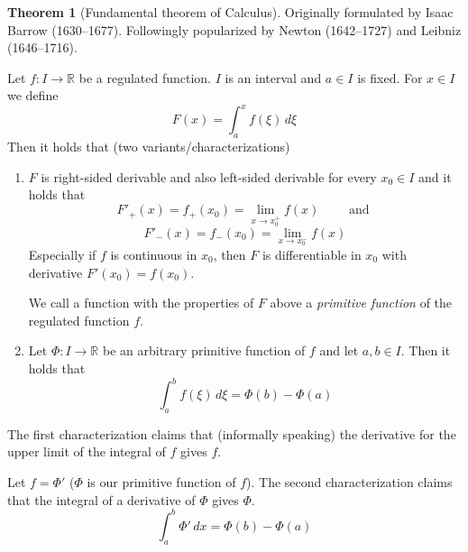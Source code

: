 \documentclass[a4paper,landscape,twocolumn]{article}
\theoremstyle{definition}
\newtheorem{theorem}{Theorem}
\begin{document}
\begin{theorem}[Fundamental theorem of Calculus]
  Originally formulated by Isaac Barrow (1630--1677).
  Followingly popularized by Newton (1642--1727) and Leibniz (1646--1716).

  Let $f: I \to \mathbb R$ be a regulated function. $I$ is an interval and $a \in I$ is fixed.
  For $x \in I$ we define
  \[ F(x) = \int_a^x f(\xi) \, d\xi \]
  Then it holds that (two variants/characterizations)
  \begin{enumerate}
    \item $F$ is right-sided derivable and also left-sided derivable for every $x_0 \in I$
      and it holds that
      \[ F'_+(x) = f_+(x_0) = \lim_{x\to x^+_0} f(x) \qquad \text{ and } \]
      \[ F'_-(x) = f_-(x_0) = \lim_{x\to x^-_0} f(x) \]
      Especially if $f$ is continuous in $x_0$, then $F$ is differentiable in $x_0$ with
      derivative $F'(x_0) = f(x_0)$.

      We call a function with the properties of $F$ above a \emph{primitive function} of the regulated function $f$.
    \item
      Let $\Phi: I \to \mathbb R$ be an arbitrary primitive function of $f$ and
      let $a,b \in I$. Then it holds that
      \[ \int_a^b f(\xi) \, d\xi = \Phi(b) - \Phi(a) \]
  \end{enumerate}

  The first characterization claims that (informally speaking)
  the derivative for the upper limit of the integral of $f$ gives $f$.

  Let $f = \Phi'$ ($\Phi$ is our primitive function of $f$).
  The second characterization claims that the integral of a derivative of $\Phi$ gives $\Phi$.
  \[ \int_a^b \Phi' \, dx = \Phi(b) - \Phi(a) \]
\end{theorem}
\end{document}
